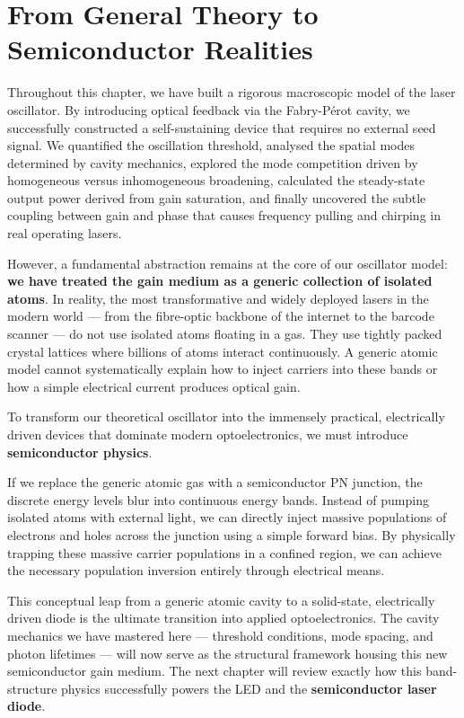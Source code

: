 \section*{From General Theory to Semiconductor Realities}

Throughout this chapter, we have built a rigorous macroscopic model of the laser oscillator. By introducing optical feedback via the Fabry-P\'{e}rot cavity, we successfully constructed a self-sustaining device that requires no external seed signal. We quantified the oscillation threshold, analysed the spatial modes determined by cavity mechanics, explored the mode competition driven by homogeneous versus inhomogeneous broadening, calculated the steady-state output power derived from gain saturation, and finally uncovered the subtle coupling between gain and phase that causes frequency pulling and chirping in real operating lasers.

However, a fundamental abstraction remains at the core of our oscillator model: \textbf{we have treated the gain medium as a generic collection of isolated atoms}. In reality, the most transformative and widely deployed lasers in the modern world --- from the fibre-optic backbone of the internet to the barcode scanner --- do not use isolated atoms floating in a gas. They use tightly packed crystal lattices where billions of atoms interact continuously. A generic atomic model cannot systematically explain how to inject carriers into these bands or how a simple electrical current produces optical gain.

\begin{keyinsight}
    To transform our theoretical oscillator into the immensely practical, electrically driven devices that dominate modern optoelectronics, we must introduce \textbf{semiconductor physics}.

    If we replace the generic atomic gas with a semiconductor PN junction, the discrete energy levels blur into continuous energy bands. Instead of pumping isolated atoms with external light, we can directly inject massive populations of electrons and holes across the junction using a simple forward bias. By physically trapping these massive carrier populations in a confined region, we can achieve the necessary population inversion entirely through electrical means.
\end{keyinsight}

This conceptual leap from a generic atomic cavity to a solid-state, electrically driven diode is the ultimate transition into applied optoelectronics. The cavity mechanics we have mastered here --- threshold conditions, mode spacing, and photon lifetimes --- will now serve as the structural framework housing this new semiconductor gain medium. The next chapter will review exactly how this band-structure physics successfully powers the LED and the \textbf{semiconductor laser diode}.
